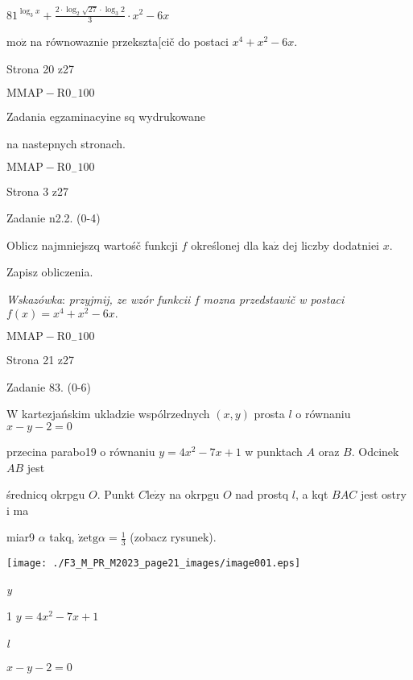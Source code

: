 \documentclass[a4paper,12pt]{article}
\begin{document}
$81^{\log_{3}x}+\displaystyle \frac{2\cdot\log_{2}\sqrt{27}\cdot\log_{3}2}{3}\cdot x^{2}-6x$

$\mathrm{m}\mathrm{o}\dot{\mathrm{z}}$ na równowaznie przekszta[cič do postaci $x^{4}+x^{2}-6x.$

Strona 20 z27

$\mathrm{M}\mathrm{M}\mathrm{A}\mathrm{P}-\mathrm{R}0_{-}100$





Zadania egzaminacyine sq wydrukowane

na nastepnych stronach.

$\mathrm{M}\mathrm{M}\mathrm{A}\mathrm{P}-\mathrm{R}0_{-}100$

Strona 3 z27





Zadanie n2.2. (0-4)

Oblicz najmniejszq wartośč funkcji $f$ określonej dla $\mathrm{k}\mathrm{a}\dot{\mathrm{z}}$ dej liczby dodatniei $x.$

Zapisz obliczenia.

{\it Wskazówka}: {\it przyjmij, ze wzór funkcii} $f$ {\it mozna przedstawič w postaci} $f(x)=x^{4}+x^{2}-6x.$

$\mathrm{M}\mathrm{M}\mathrm{A}\mathrm{P}-\mathrm{R}0_{-}100$

Strona 21 z27





Zadanie 83. (0-6)

$\mathrm{W}$ kartezjańskim ukladzie wspólrzednych $(x,y)$ prosta $l$ o równaniu $x-y-2=0$

przecina parabo19 o równaniu $y=4x^{2}-7x+1$ w punktach $A$ oraz $B$. Odcinek $AB$ jest

średnicq okrpgu $O$. Punkt $C \mathrm{l}\mathrm{e}\dot{\mathrm{z}}\mathrm{y}$ na okrpgu $O$ nad prostq $l$, a kqt $BAC$ jest ostry i ma

miar9 $\alpha$ takq, $\dot{\mathrm{z}}\mathrm{e} \displaystyle \mathrm{t}\mathrm{g}\alpha=\frac{1}{3}$ (zobacz rysunek).
\begin{center}
\texttt{[image: ./F3\_M\_PR\_M2023\_page21\_images/image001.eps]}
\end{center}
{\it y}

1  $y=4x^{2}-7x+1$

{\it l}

$x-y-2=0$
\end{document}
